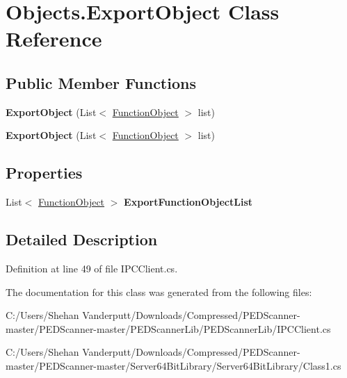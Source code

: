 \hypertarget{class_objects_1_1_export_object}{}\section{Objects.\+Export\+Object Class Reference}
\label{class_objects_1_1_export_object}
\subsection*{Public Member Functions}
\begin{DoxyCompactItemize}
\item 
\mbox{\label{class_objects_1_1_export_object_a4eff4f8b60598d4b697d2d4c81f4472e}} 
{\bfseries Export\+Object} (List$<$ \mbox{\hyperlink{class_objects_1_1_function_object}{Function\+Object}} $>$ list)
\item 
\mbox{\label{class_objects_1_1_export_object_a4eff4f8b60598d4b697d2d4c81f4472e}} 
{\bfseries Export\+Object} (List$<$ \mbox{\hyperlink{class_objects_1_1_function_object}{Function\+Object}} $>$ list)
\end{DoxyCompactItemize}
\subsection*{Properties}
\begin{DoxyCompactItemize}
\item 
\mbox{\label{class_objects_1_1_export_object_a916515e6630ee9bfd58ce11ab6833991}} 
List$<$ \mbox{\hyperlink{class_objects_1_1_function_object}{Function\+Object}} $>$ {\bfseries Export\+Function\+Object\+List}
\end{DoxyCompactItemize}


\subsection{Detailed Description}


Definition at line 49 of file I\+P\+C\+Client.\+cs.



The documentation for this class was generated from the following files\+:\begin{DoxyCompactItemize}
\item 
C\+:/\+Users/\+Shehan Vanderputt/\+Downloads/\+Compressed/\+P\+E\+D\+Scanner-\/master/\+P\+E\+D\+Scanner-\/master/\+P\+E\+D\+Scanner\+Lib/\+P\+E\+D\+Scanner\+Lib/I\+P\+C\+Client.\+cs\item 
C\+:/\+Users/\+Shehan Vanderputt/\+Downloads/\+Compressed/\+P\+E\+D\+Scanner-\/master/\+P\+E\+D\+Scanner-\/master/\+Server64\+Bit\+Library/\+Server64\+Bit\+Library/Class1.\+cs\end{DoxyCompactItemize}
